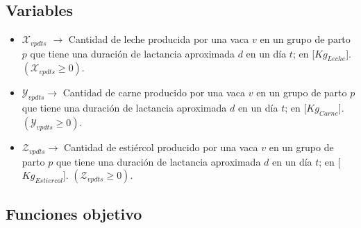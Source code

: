 \subsection{Variables}
\begin{itemize}
    \item \textbf{$\mathcal{X}_{vpdts}$} $\longrightarrow$ Cantidad de leche producida por una vaca $v$ en un grupo de parto $p$ que tiene una duración de lactancia aproximada $d$ en un día $t$; en [$Kg_{Leche}$]. $\left(\mathcal{X}_{vpdts}\geq 0 \right)$.
    \item \textbf{$\mathcal{Y}_{vpdts}$}$\longrightarrow$ Cantidad de carne producido por una vaca $v$ en un grupo de parto $p$ que tiene una duración de lactancia aproximada $d$ en un día $t$; en [$Kg_{Carne}$].  $\left(\mathcal{Y}_{vpdts}\geq 0 \right)$.

    \item \textbf{$\mathcal{Z}_{vpdts}$}$\longrightarrow$ Cantidad de estiércol producido por una vaca $v$ en un grupo de parto $p$ que tiene una duración de lactancia aproximada $d$ en un día $t$; en [$Kg_{Estiercol}$].  $\left(\mathcal{Z}_{vpdts}\geq 0 \right)$.
\end{itemize}

\subsection{Funciones objetivo}

